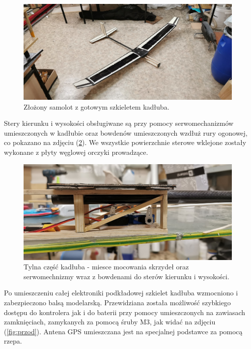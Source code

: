 \documentclass[12pt, a4paper]{article}
\let\oldref\ref
\renewcommand{\ref}[1]{(\oldref{#1})}
\begin{document}
\begin{figure}[ht]
    \centering
    \includegraphics[width=1\textwidth]{szkielet}
    \caption{Złożony samolot z gotowym szkieletem kadłuba.}
    \label{fig:szkielet}
\end{figure}

Stery kierunku i wysokości obsługiwane są przy pomocy serwomechanizmów umieszczonych w kadłubie oraz bowdenów umieszczonych wzdłuż rury ogonowej, co pokazano na zdjęciu \ref{fig:tyl}. We wszystkie powierzchnie sterowe wklejone zostały wykonane z płyty węglowej orczyki prowadzące. 

\begin{figure}[ht]
    \centering
    \includegraphics[width=1\textwidth]{tyl}
    \caption{Tylna część kadłuba - miesce mocowania skrzydeł oraz serwomechnizmy wraz z bowdenami do sterów kierunku i wysokości.}
    \label{fig:tyl}
\end{figure}

Po umieszczeniu całej elektroniki podkładowej szkielet kadłuba wzmocniono i zabezpieczono balsą modelarską. Przewidziana została możliwość szybkiego dostępu do kontrolera jak i do baterii przy pomocy umieszczonych na zawiasach zamknięciach, zamykanych za pomocą śruby M3, jak widać na zdjęciu \ref{fig:przod}. Antena GPS umieszczana jest na specjalnej podstawce za pomocą rzepa.
\end{document}
